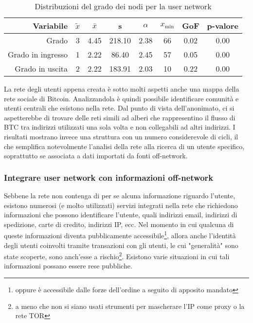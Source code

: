 \begin{table}
\centering
\caption{Distribuzioni del grado dei nodi per la user network\label{table:gofuser}}
\begin{tabular}{r | c c c c c c c}
\textbf{Variabile} & \textbf{$\tilde{x}$} & \textbf{$\bar{x}$} & \textbf{s} & \textbf{$\alpha$} & \textbf{$x_\text{min}$} & \textbf{GoF} & \textbf{p-valore} \\
\hline
Grado & 3 & 4.45 & 218.10 & 2.38 & 66 & 0.02 & 0.00 \\
Grado in ingresso & 1 & 2.22 & 86.40 & 2.45 & 57 & 0.05 & 0.00 \\
Grado in uscita & 2 & 2.22 & 183.91 & 2.03 & 10 & 0.22 & 0.00 \\
\end{tabular}
\end{table}

La rete degli utenti appena creata è sotto molti aspetti anche una mappa della rete sociale di Bitcoin. Analizzandola è quindi possibile identificare comunità e utenti centrali che esistono nella rete.
Dal punto di vista dell'anonimato, ci si aspetterebbe di trovare delle reti simili ad alberi che rappresentino il flusso di BTC tra indirizzi utilizzati una sola volta e non collegabili ad altri indirizzi.
I risultati mostrano invece una struttura con un numero considerevole di cicli, il che semplifica notevolmente l'analisi della rete alla ricerca di un utente specifico, soprattutto se associata a dati importati da fonti off-network.

\subsubsection{Integrare user network con informazioni off-network}

Sebbene la rete non contenga di per se alcuna informazione riguardo l'utente, esistono numerosi (e molto utilizzati) servizi integrati nella rete che richiedono informazioni che possono identificare l'utente, quali indirizzi email, indirizzi di spedizione, carte di credito, indirizzi IP, ecc.
Nel momento in cui qualcuna di queste informazioni diventa pubblicamente accessibile\footnote{oppure è accessibile dalle forze dell'ordine a seguito di apposito mandato}, allora anche l'identità degli utenti coinvolti tramite transazioni con gli utenti, le cui "generalità" sono state scoperte, sono anch'esse a rischio\footnote{a meno che non si siano usati strumenti per mascherare l'IP come proxy o la rete TOR}. Esistono varie situazioni in cui tali informazioni possano essere rese pubbliche.

